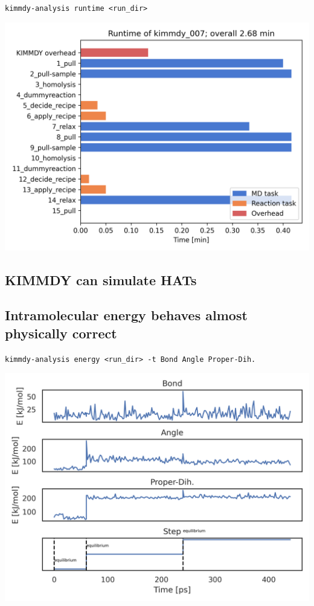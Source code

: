 \documentclass[
  letterpaper,
  DIV=11,
  numbers=noendperiod]{scrartcl}
\begin{document}
\texttt{kimmdy-analysis\ runtime\ \textless{}run\_dir\textgreater{}}

\includegraphics{www/tripelhelix_runtime.png}

\hypertarget{kimmdy-can-simulate-hats}{%
\subsection{KIMMDY can simulate HATs}\label{kimmdy-can-simulate-hats}}

\hypertarget{intramolecular-energy-behaves-almost-physically-correct}{%
\subsection{Intramolecular energy behaves almost physically
correct}\label{intramolecular-energy-behaves-almost-physically-correct}}

\texttt{kimmdy-analysis\ energy\ \textless{}run\_dir\textgreater{}\ -t\ Bond\ Angle\ Proper-Dih.}

\includegraphics{www/ala_bonded.png}
\end{document}
